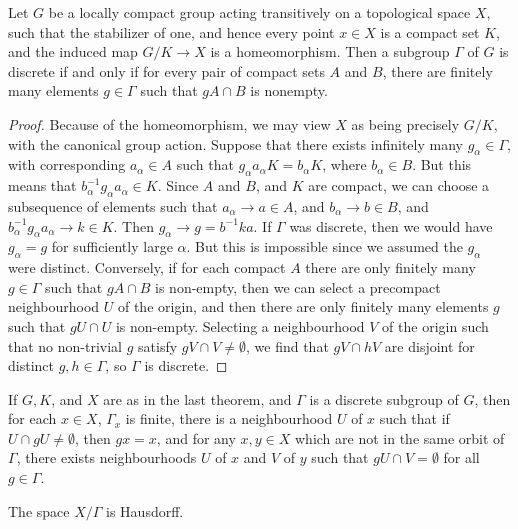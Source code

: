 \begin{theorem}
    Let $G$ be a locally compact group acting transitively on a topological space $X$, such that the stabilizer of one, and hence every point $x \in X$ is a compact set $K$, and the induced map $G/K \to X$ is a homeomorphism. Then a subgroup $\Gamma$ of $G$ is discrete if and only if for every pair of compact sets $A$ and $B$, there are finitely many elements $g \in \Gamma$ such that $gA \cap B$ is nonempty.
\end{theorem}
\begin{proof}
    Because of the homeomorphism, we may view $X$ as being precisely $G/K$, with the canonical group action. Suppose that there exists infinitely many $g_\alpha \in \Gamma$, with corresponding $a_\alpha \in A$ such that $g_\alpha a_\alpha K = b_\alpha K$, where $b_\alpha \in B$. But this means that $b_\alpha^{-1} g_\alpha a_\alpha \in K$. Since $A$ and $B$, and $K$ are compact, we can choose a subsequence of elements such that $a_\alpha \to a \in A$, and $b_\alpha \to b \in B$, and $b_\alpha^{-1} g_\alpha a_\alpha \to k \in K$. Then $g_\alpha \to g = b^{-1}ka$. If $\Gamma$ was discrete, then we would have $g_\alpha = g$ for sufficiently large $\alpha$. But this is impossible since we assumed the $g_\alpha$ were distinct. Conversely, if for each compact $A$ there are only finitely many $g \in \Gamma$ such that $gA \cap B$ is non-empty, then we can select a precompact neighbourhood $U$ of the origin, and then there are only finitely many elements $g$ such that $gU \cap U$ is non-empty. Selecting a neighbourhood $V$ of the origin such that no non-trivial $g$ satisfy $gV \cap V \neq \emptyset$, we find that $gV \cap hV$ are disjoint for distinct $g,h \in \Gamma$, so $\Gamma$ is discrete.
\end{proof}

\begin{corollary}
    If $G,K$, and $X$ are as in the last theorem, and $\Gamma$ is a discrete subgroup of $G$, then for each $x \in X$, $\Gamma_x$ is finite, there is a neighbourhood $U$ of $x$ such that if $U \cap gU \neq \emptyset$, then $gx = x$, and for any $x,y \in X$ which are not in the same orbit of $\Gamma$, there exists neighbourhoods $U$ of $x$ and $V$ of $y$ such that $gU \cap V = \emptyset$ for all $g \in \Gamma$.
\end{corollary}

\begin{corollary}
    The space $X/\Gamma$ is Hausdorff.
\end{corollary}

